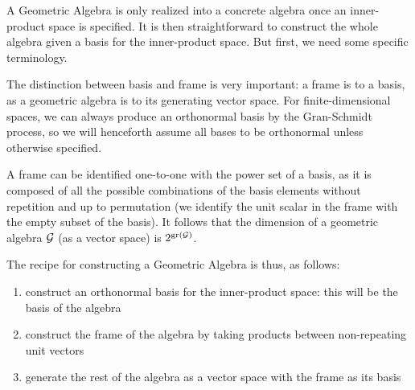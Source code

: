 A Geometric Algebra is only realized into a concrete algebra once an inner-product space is specified. It is then straightforward to construct the whole algebra given a basis for the inner-product space. But first, we need some specific terminology.





The distinction between basis and frame is very important: a frame is to a basis, as a geometric algebra is to its generating vector space.
For finite-dimensional spaces, we can always produce an orthonormal basis by the Gran-Schmidt process, so we will henceforth assume all bases to be orthonormal unless otherwise specified.

A frame can be identified one-to-one with the power set of a basis, as it is composed of all the possible combinations of the basis elements without repetition and up to permutation (we identify the unit scalar in the frame with the empty subset of the basis). It follows that the dimension of a geometric algebra $\mathcal{G}$ (as a vector space) is $2^{\mathrm{gr}\left(\mathcal{G}\right)}$.

The recipe for constructing a Geometric Algebra is thus, as follows:
\begin{enumerate}
	\item construct an orthonormal basis for the inner-product space: this will be the basis of the algebra
	\item construct the frame of the algebra by taking products between non-repeating unit vectors
	\item generate the rest of the algebra as a vector space with the frame as its basis
\end{enumerate}

% 
% 
